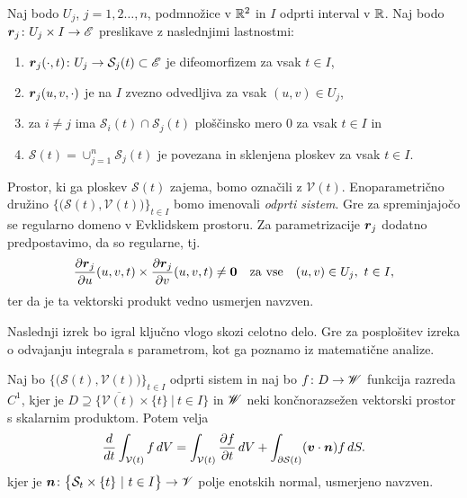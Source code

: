 Naj bodo $U_j$, $j=1,2\dots,n$, podmnožice v $\mathbb R^2$ in $I$ odprti interval v $\mathbb R$.
Naj bodo $\boldsymbol r_j\colon U_j\times I\to\mathscr E$ preslikave z naslednjimi lastnostmi:
\begin{enumerate}
	\item $\boldsymbol r_j(\cdot,t)\colon U_j\to\mathcal{S}_j(t)\subset\mathscr E$ je difeomorfizem za vsak $t\in I$,
	\item $\boldsymbol r_j(u,v,\cdot)$ je na $I$ zvezno odvedljiva za vsak $(u,v)\in U_j$,
	\item za $i\neq j$ ima $\mathcal{S}_i(t)\cap\mathcal{S}_j(t)$ ploščinsko mero 0 za vsak $t\in I$ in
	\item $\mathcal{S}(t)=\cup_{j=1}^n\mathcal{S}_j(t)$ je povezana in sklenjena ploskev za vsak $t\in I$.
\end{enumerate}
Prostor, ki ga ploskev $\mathcal{S}(t)$ zajema, bomo označili z $\mathcal{V}(t)$. Enoparametrično družino
$\big\{\big(\mathcal{S}(t),\mathcal{V}(t)\big)\}_{t\in I}$
bomo imenovali \emph{odprti sistem}. Gre za spreminjajočo se regularno domeno v Evklidskem prostoru.
Za parametrizacije $\boldsymbol r_j$ dodatno predpostavimo, da so regularne, tj.
\[
	\frac{\partial\boldsymbol r_j}{\partial u}(u,v,t) \times \frac{\partial\boldsymbol r_j}{\partial v}(u,v,t) \neq \boldsymbol 0
	\quad\mathrm{za\ vse}\quad (u,v)\in U_j,\ t\in I,
\]
ter da je ta vektorski produkt vedno usmerjen navzven.

Naslednji izrek bo igral ključno vlogo skozi celotno delo. Gre za posplošitev izreka o odvajanju integrala
s parametrom, kot ga poznamo iz matematične analize.
\begin{izrek}
	Naj bo $\big\{\big(\mathcal{S}(t),\mathcal{V}(t)\big)\}_{t\in I}$ odprti sistem in naj bo
	$f\colon D\to\mathscr W$ funkcija razreda $C^1$, kjer je $D\supseteq \big\{ \overline{\mathcal{V}(t)}\times\{t\}\ |\  t\in I \big\}$
	in $\mathscr W$ neki končnorazsežen vektorski prostor s skalarnim produktom. Potem velja
	\begin{equation*}
		\frac{d}{dt}\int_{\mathcal{V}(t)}f\,dV =
		\int_{\mathcal{V}(t)}\frac{\partial f}{\partial t}\,dV +
		\int_{\partial\mathcal{S}(t)}(\boldsymbol v\cdot\boldsymbol n)f\,dS.
	\end{equation*}
	kjer je $\vek{n}\colon\big\{\mathcal{S}_t\times\{t\}\ |\ t\in I\big\}\to\V$ polje enotskih normal, usmerjeno navzven.
\end{izrek}
